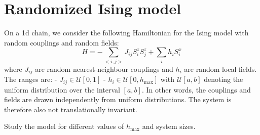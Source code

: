 \documentclass{article}
\begin{document}
\section*{Randomized Ising model}

On a 1d chain, we consider the following Hamiltonian for the Ising model with random couplings and random fields:
\begin{equation}
H = - \sum_{<i,j>} J_{ij} S^z_i S^z_j + \sum_{i} h_i S^x_i
\end{equation}
where $J_{ij}$ are random nearest-neighbour couplings and $h_i$ are random local fields.
The ranges are:
- $J_{ij} \in \mathcal{U}[0, 1]$
- $h_i \in \mathcal{U}[0, h_{\max}]$
with $\mathcal{U}[a, b]$ denoting the uniform distribution over the interval $[a, b]$.
In other words, the couplings and fields are drawn independently from uniform distributions.
The system is therefore also not translationally invariant.

Study the model for different values of $h_{\max}$ and system sizes.
\end{document}
